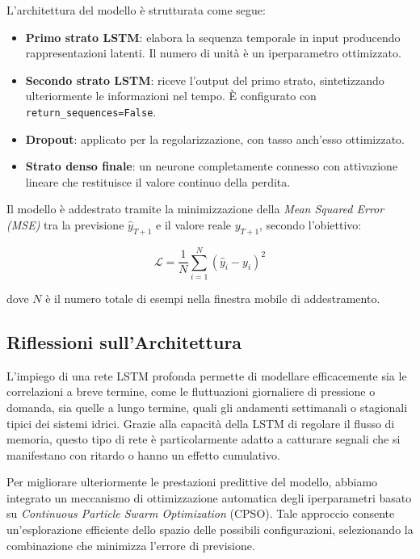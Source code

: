 \documentclass{article}
\begin{document}
L’architettura del modello è strutturata come segue:

\begin{itemize}
    \item \textbf{Primo strato LSTM}: elabora la sequenza temporale in input producendo rappresentazioni latenti. Il numero di unità è un iperparametro ottimizzato.
    \item \textbf{Secondo strato LSTM}: riceve l'output del primo strato, sintetizzando ulteriormente le informazioni nel tempo. È configurato con \verb|return_sequences=False|.
    \item \textbf{Dropout}: applicato per la regolarizzazione, con tasso anch'esso ottimizzato.
    \item \textbf{Strato denso finale}: un neurone completamente connesso con attivazione lineare che restituisce il valore continuo della perdita.
\end{itemize}

Il modello è addestrato tramite la minimizzazione della \textit{Mean Squared Error (MSE)} tra la 
previsione $\hat{y}_{T+1}$ e il valore reale $y_{T+1}$, secondo l’obiettivo:

\begin{equation}
\mathcal{L} = \frac{1}{N} \sum_{i=1}^N \left( \hat{y}_{i} - y_{i} \right)^2
\end{equation}

dove $N$ è il numero totale di esempi nella finestra mobile di addestramento.

\subsection{Riflessioni sull’Architettura}

L’impiego di una rete LSTM profonda permette di modellare efficacemente sia le correlazioni a breve termine, 
come le fluttuazioni giornaliere di pressione o domanda, sia quelle a lungo termine, quali gli andamenti 
settimanali o stagionali tipici dei sistemi idrici. Grazie alla capacità della LSTM di regolare il flusso di 
memoria, questo tipo di rete è particolarmente adatto a catturare segnali che si manifestano con ritardo o hanno 
un effetto cumulativo.

Per migliorare ulteriormente le prestazioni predittive del modello, abbiamo integrato un meccanismo di ottimizzazione 
automatica degli iperparametri basato su \textit{Continuous Particle Swarm Optimization} (CPSO). Tale approccio 
consente un’esplorazione efficiente dello spazio delle possibili configurazioni, selezionando la combinazione che 
minimizza l’errore di previsione.
\end{document}
